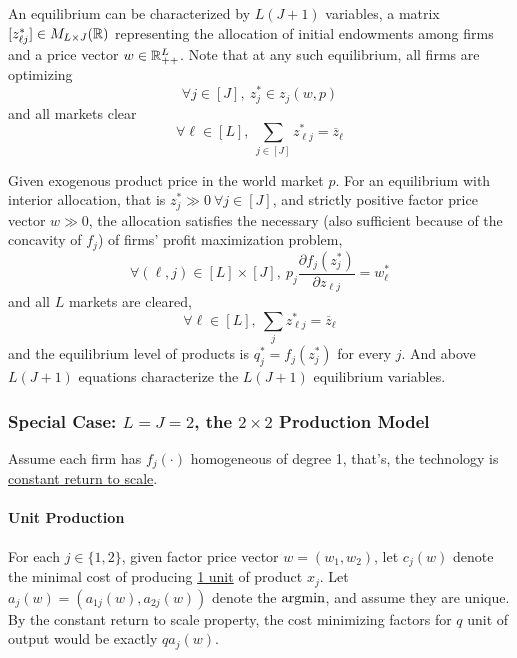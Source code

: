 \documentclass{report}
\begin{document}
			\begin{remark}
				An equilibrium can be characterized by $L(J+1)$ variables, a matrix $[z^*_{\ell j}] \in M_{L \times J}(\mathbb{R})$ representing the allocation of initial endowments among firms and a price vector $w \in \mathbb{R}^L_{++}$. Note that at any such equilibrium, all firms are optimizing
				\begin{equation}
					\forall j \in [J],\ z^*_j \in z_j(w, p)
				\end{equation}
				and all markets clear
				\begin{equation}
					\forall \ell \in [L],\ \sum_{j\in [J]} z^*_{\ell j} = \overline{z}_{\ell}
				\end{equation}
			\end{remark}
			
			\begin{proposition}
				Given exogenous product price in the world market $p$. For an equilibrium with interior allocation, that is $z^*_j \gg 0\ \forall j \in [J]$, and strictly positive factor price vector $w \gg 0$, the allocation satisfies the necessary (also sufficient because of the concavity of $f_j$) of firms' profit maximization problem,
				\begin{equation}
					\forall (\ell, j) \in [L]\times [J],\ 
					p_{j} \frac{\partial f_{j}\left(z_{j}^{*}\right)}{\partial z_{\ell j}}=w_{\ell}^{*}
				\end{equation}
				and all $L$ markets are cleared,
				\begin{equation}
					\forall \ell \in [L],\ 
					\sum_{j} z_{\ell j}^{*}=\overline{z}_{\ell}
				\end{equation}
				and the equilibrium level of products is $q^*_j = f_j(z_j^*)$ for every $j$. And above $L(J+1)$ equations characterize the $L(J+1)$ equilibrium variables.
			\end{proposition}
			
			\subsubsection{Special Case: $L=J=2$, the $2 \times 2$ Production Model}
			\begin{assumption}
				Assume each firm has $f_j(\cdot)$ homogeneous of degree 1, that's, the technology is \ul{constant return to scale}.
			\end{assumption}
			
			\paragraph{Unit Production} For each $j \in \{1, 2\}$, given factor price vector $w = (w_1, w_2)$, let $c_j(w)$ denote the minimal cost of producing \ul{1 unit} of product $x_j$. Let $a_j(w) = (a_{1j}(w), a_{2j}(w))$ denote the $\operatorname*{argmin}$, and assume they are unique. By the constant return to scale property, the cost minimizing factors for $q$ unit of output would be exactly $q a_j(w)$.
			
\end{document}
